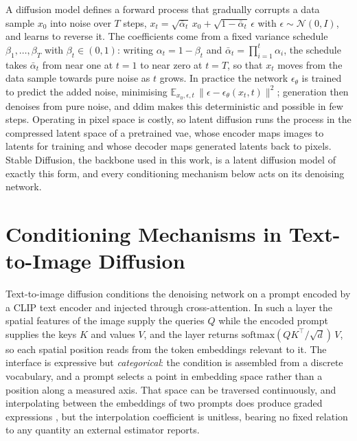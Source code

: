 A diffusion model \citep{ho2020ddpm} defines a forward process that gradually corrupts a data
sample $x_0$ into noise over $T$ steps, $x_t = \sqrt{\bar\alpha_t}\,x_0 +
\sqrt{1-\bar\alpha_t}\,\epsilon$ with $\epsilon\sim\mathcal{N}(0,I)$, and learns to reverse it.
The coefficients come from a fixed variance schedule $\beta_1,\dots,\beta_T$ with
$\beta_t\in(0,1)$: writing $\alpha_t=1-\beta_t$ and $\bar\alpha_t=\prod_{i=1}^{t}\alpha_i$, the
schedule takes $\bar\alpha_t$ from near one at $t=1$ to near zero at $t=T$, so that $x_t$ moves
from the data sample towards pure noise as $t$ grows. In
practice the network $\epsilon_\theta$ is trained to predict the added noise, minimising
$\mathbb{E}_{x_0,\epsilon,t}\,\lVert \epsilon - \epsilon_\theta(x_t,t) \rVert^2$; generation then
denoises from pure noise, and \gls{ddim} \citep{song2021ddim} makes this deterministic and possible in
few steps. Operating in pixel space is costly, so latent diffusion \citep{rombach2022ldm} runs the
process in the compressed latent space of a pretrained \gls{vae}, whose encoder maps images to
latents for training and whose decoder maps generated latents back to pixels. Stable Diffusion,
the backbone used in this work, is a latent diffusion model of exactly this form, and every
conditioning mechanism below acts on its denoising network.

\section{Conditioning Mechanisms in Text-to-Image Diffusion}\label{sec:bg-conditioning}


Text-to-image diffusion conditions the denoising network on a prompt encoded by a CLIP text
encoder \citep{radford2021clip} and injected through cross-attention. In such a layer the spatial
features of the image supply the queries $Q$ while the encoded prompt supplies the keys $K$ and
values $V$, and the layer returns $\mathrm{softmax}(QK^{\top}/\sqrt{d})\,V$, so each spatial
position reads from the token embeddings relevant to it. The interface is expressive but
\emph{categorical}: the condition is assembled from a discrete vocabulary, and a prompt selects a
point in embedding space rather than a position along a measured axis. That space can be traversed
continuously, and interpolating between the embeddings of two prompts does produce graded
expressions \citep{hua2026pixelsmile}, but the interpolation coefficient is unitless, bearing no
fixed relation to any quantity an external estimator reports.

